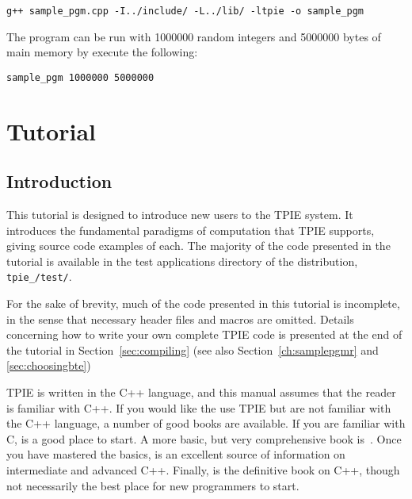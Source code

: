 \begin{verbatim}
g++ sample_pgm.cpp -I../include/ -L../lib/ -ltpie -o sample_pgm
\end{verbatim}

The program can be run with 1000000 random integers and 5000000 bytes of main
memory by execute the following:
\begin{verbatim}
sample_pgm 1000000 5000000
\end{verbatim}


\chapter{Tutorial}
\label{ch:tutorial}

\section{Introduction}

This tutorial is designed to introduce new users to the TPIE system.
It introduces the fundamental paradigms of computation that TPIE
supports, giving source code examples of each.  The majority of the
code presented in the tutorial is available in the test
applications directory of the distribution, 
{\tt tpie\_\version/test/}.

For the sake of brevity, much of the code presented in this tutorial is
incomplete, in the sense that necessary header files 
and macros are omitted. Details concerning how to write your
own complete TPIE code is presented at the end of the tutorial in
Section~\ref{sec:compiling} (see also Section~\ref{ch:samplepgmr} and
\ref{sec:choosingbte})

TPIE is written in the C++ language, and this manual assumes
that the reader is familiar with C++.
If you would like the use TPIE but are not familiar with the C++
language, a number of good books are available. If you are familiar with
C, \cite{pohl:c++} is a good place to start. A more basic, but
very comprehensive book is~\cite{deitel:c++}. Once you have mastered the
basics, \cite{meyers:effective} is an excellent source of information on
intermediate and advanced C++.  Finally, \cite{ellis:arm} is the definitive
book on C++, though not necessarily the best place for new programmers to
start.

